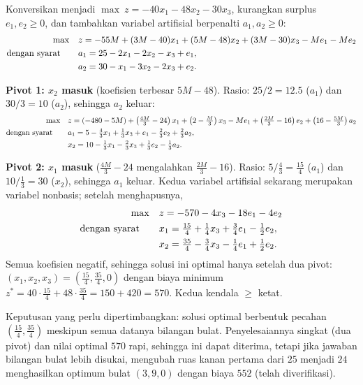 
Konversikan menjadi $\max\ z = -40x_1 - 48x_2 - 30x_3$, kurangkan surplus
$e_1, e_2 \geq 0$, dan tambahkan variabel artifisial berpenalti $a_1, a_2 \geq 0$:
\[
\begin{aligned}
\max\quad & z = -55M + (3M - 40)x_1 + (5M - 48)x_2 + (3M - 30)x_3 - M e_1 - M e_2 \\
\mbox{dengan syarat}\quad\quad & a_1 = 25 - 2x_1 - 2x_2 - x_3 + e_1, \\
& a_2 = 30 - x_1 - 3x_2 - 2x_3 + e_2.
\end{aligned}
\]

\textbf{Pivot 1: $x_2$ masuk} (koefisien terbesar $5M - 48$). Rasio:
$25/2 = 12.5$ ($a_1$) dan $30/3 = 10$ ($a_2$), sehingga $a_2$ keluar:
\[
\begin{aligned}
\max\quad & z = (-480 - 5M) + \left(\tfrac{4M}{3} - 24\right)x_1
  + \left(2 - \tfrac{M}{3}\right)x_3 - M e_1
  + \left(\tfrac{2M}{3} - 16\right)e_2 + \left(16 - \tfrac{5M}{3}\right)a_2 \\
\mbox{dengan syarat}\quad\quad & a_1 = 5 - \tfrac43 x_1 + \tfrac13 x_3 + e_1 - \tfrac23 e_2 + \tfrac23 a_2, \\
& x_2 = 10 - \tfrac13 x_1 - \tfrac23 x_3 + \tfrac13 e_2 - \tfrac13 a_2.
\end{aligned}
\]

\textbf{Pivot 2: $x_1$ masuk} ($\tfrac{4M}{3} - 24$ mengalahkan
$\tfrac{2M}{3} - 16$). Rasio: $5/\tfrac43 = \tfrac{15}{4}$ ($a_1$) dan
$10/\tfrac13 = 30$ ($x_2$), sehingga $a_1$ keluar. Kedua variabel artifisial sekarang
merupakan variabel nonbasis; setelah menghapusnya,
\[
\begin{aligned}
\max\quad & z = -570 - 4x_3 - 18e_1 - 4e_2 \\
\mbox{dengan syarat}\quad\quad & x_1 = \tfrac{15}{4} + \tfrac14 x_3 + \tfrac34 e_1 - \tfrac12 e_2, \\
& x_2 = \tfrac{35}{4} - \tfrac34 x_3 - \tfrac14 e_1 + \tfrac12 e_2.
\end{aligned}
\]
Semua koefisien negatif, sehingga solusi ini optimal hanya setelah dua pivot:
$(x_1, x_2, x_3) = \left(\tfrac{15}{4}, \tfrac{35}{4}, 0\right)$ dengan
biaya minimum $z^* = 40 \cdot \tfrac{15}{4} + 48 \cdot \tfrac{35}{4}
= 150 + 420 = 570$. Kedua kendala $\geq$ ketat.

\begin{qaflag}
Keputusan yang perlu dipertimbangkan: solusi optimal berbentuk pecahan
$\left(\tfrac{15}{4}, \tfrac{35}{4}\right)$ meskipun semua datanya
bilangan bulat. Penyelesaiannya singkat (dua pivot) dan nilai optimal $570$
rapi, sehingga ini dapat diterima, tetapi jika jawaban bilangan bulat lebih disukai,
mengubah ruas kanan pertama dari $25$ menjadi $24$ menghasilkan
optimum bulat $(3, 9, 0)$ dengan biaya $552$ (telah diverifikasi).
\end{qaflag}


